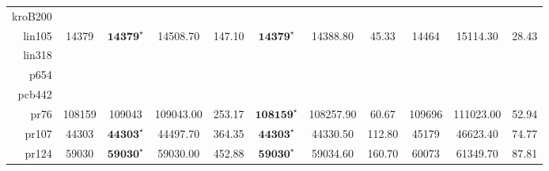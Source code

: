 \documentclass[12pt]{ctexart}
\begin{document}
\begin{table}[htbp]
\begin{tabular}{rcccccccccc}
        kroB200                                                                                                                                                                                                                                                                                   \\
        lin105                        & 14379                             & $\textbf{14379}^\star$      & 14508.70                               & 147.10           & $\textbf{14379}^\star$  & 14388.80         & 45.33            & 14464                 & 15114.30         & 28.43            \\
        lin318                                                                                                                                                                                                                                                                                    \\
        p654                                                                                                                                                                                                                                                                                      \\
        pcb442                                                                                                                                                                                                                                                                                    \\
        pr76                          & 108159                            & 109043                      & 109043.00                              & 253.17           & $\textbf{108159}^\star$ & 108257.90        & 60.67            & 109696                & 111023.00        & 52.94            \\
        pr107                         & 44303                             & $\textbf{44303}^\star$      & 44497.70                               & 364.35           & $\textbf{44303}^\star$  & 44330.50         & 112.80           & 45179                 & 46623.40         & 74.77            \\
        pr124                         & 59030                             & $\textbf{59030}^\star$      & 59030.00                               & 452.88           & $\textbf{59030}^\star$  & 59034.60         & 160.70           & 60073                 & 61349.70         & 87.81            \\

\end{tabular}
\end{table}
\end{document}
